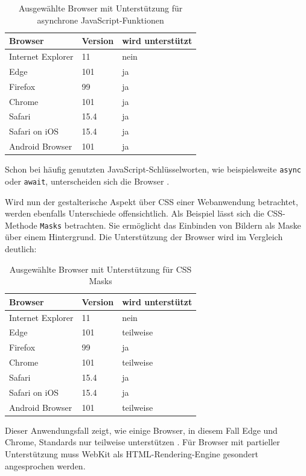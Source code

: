 \documentclass[a4paper]{scrartcl}
\begin{document}
 \begin{table}[H]
 	\centering
 	\caption{Ausgewählte Browser mit Unterstützung für asynchrone JavaScript-Funktionen}
 	\begin{center}
 		\begin{tabularx}{\linewidth}{| Y | Y | Y |}
 			\hline
 			\textbf{Browser} & \textbf{Version} & \textbf{wird unterstützt} \\
 			\hline \hline
 			Internet Explorer & 11 & nein \\
 			\hline
 			Edge & 101 & ja \\
 			\hline
 			Firefox & 99 & ja \\
 			\hline
 			Chrome & 101 & ja \\
 			\hline
 			Safari & 15.4 & ja \\
 			\hline
 			Safari on iOS & 15.4 & ja \\
 			\hline
 			Android Browser & 101 & ja \\
 			\hline
 		\end{tabularx}
 	\end{center}
	Schon bei häufig genutzten JavaScript-Schlüsselworten, wie beispielsweite \texttt{async} oder \texttt{await}, unterscheiden sich die Browser \autocite{Async_Functions}.  
 \end{table}

Wird nun der gestalterische Aspekt über CSS einer Webanwendung betrachtet, werden ebenfalls Unterschiede offensichtlich. Als Beispiel lässt sich die CSS-Methode \texttt{Masks} betrachten. Sie ermöglicht das Einbinden von Bildern als Maske über einem Hintergrund. Die Unterstützung der Browser wird im Vergleich deutlich:

 \begin{table}[H]
 	\centering
 	\caption{Ausgewählte Browser mit Unterstützung für CSS Masks}
 	\begin{center}
 		\begin{tabularx}{\linewidth}{| Y | Y | Y |}
 			\hline
 			\textbf{Browser} & \textbf{Version} & \textbf{wird unterstützt} \\
 			\hline \hline
 			Internet Explorer & 11 & nein \\
 			\hline
 			Edge & 101 & teilweise \\
 			\hline
 			Firefox & 99 & ja \\
 			\hline
 			Chrome & 101 & teilweise \\
 			\hline
 			Safari & 15.4 & ja \\
 			\hline
 			Safari on iOS & 15.4 & ja \\
 			\hline
 			Android Browser & 101 & teilweise \\
 			\hline
 		\end{tabularx}
 	\end{center}
	Dieser Anwendungsfall zeigt, wie einige Browser, in diesem Fall Edge und Chrome, Standards nur teilweise unterstützen \autocite{CSS_Masks}. Für Browser mit partieller Unterstützung muss WebKit als HTML-Rendering-Engine gesondert angesprochen werden.
 \end{table}
\end{document}
